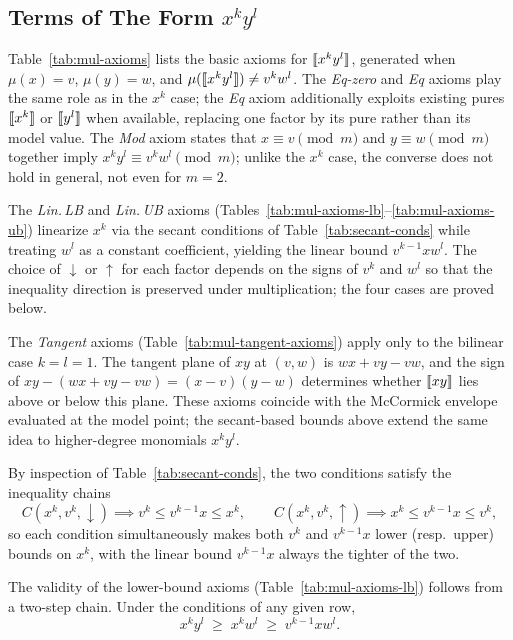 \subsection{Terms of The Form $x^k y^l$}







Table~\ref{tab:mul-axioms} lists the basic axioms for $\llbracket x^k y^l \rrbracket$, generated when
$\mu(x)=v$, $\mu(y)=w$, and $\mu(\llbracket x^k y^l \rrbracket) \neq v^k w^l$.
The \textit{Eq-zero} and \textit{Eq} axioms play the same role as in the $x^k$ case;
the \textit{Eq} axiom additionally exploits existing pures $\llbracket x^k \rrbracket$ or $\llbracket y^l \rrbracket$ when
available, replacing one factor by its pure rather than its model value.
The \textit{Mod} axiom states that $x \equiv v \pmod{m}$ and $y \equiv w \pmod{m}$ together
imply $x^k y^l \equiv v^k w^l \pmod{m}$; unlike the $x^k$ case, the converse does not hold in
general, not even for $m = 2$.

The \textit{Lin.\,LB} and \textit{Lin.\,UB} axioms
(Tables~\ref{tab:mul-axioms-lb}--\ref{tab:mul-axioms-ub}) linearize $x^k$ via the secant
conditions of Table~\ref{tab:secant-conds} while treating $w^l$ as a constant coefficient,
yielding the linear bound $v^{k-1}x w^l$.
The choice of $\downarrow$ or $\uparrow$ for each factor depends on the signs of $v^k$ and
$w^l$ so that the inequality direction is preserved under multiplication; the four cases are
proved below.

The \textit{Tangent} axioms (Table~\ref{tab:mul-tangent-axioms}) apply only to the bilinear
case $k = l = 1$.
The tangent plane of $xy$ at $(v, w)$ is $wx + vy - vw$, and the sign of
$xy - (wx + vy - vw) = (x-v)(y-w)$ determines whether $\llbracket xy \rrbracket$ lies above or below this
plane.
These axioms coincide with the McCormick envelope~\cite{mccormick1976} evaluated at the
model point; the secant-based bounds above extend the same idea to higher-degree monomials
$x^k y^l$.

By inspection of Table~\ref{tab:secant-conds}, the two conditions satisfy the inequality chains
\[
	\mathit{C}(x^k,v^k,\downarrow) \implies v^k \leq v^{k-1}x \leq x^k,
	\qquad
	\mathit{C}(x^k,v^k,\uparrow) \implies x^k \leq v^{k-1}x \leq v^k,
\]
so each condition simultaneously makes both $v^k$ and $v^{k-1}x$ lower (resp.\ upper) bounds on $x^k$,
with the linear bound $v^{k-1}x$ always the tighter of the two.

The validity of the lower-bound axioms (Table~\ref{tab:mul-axioms-lb}) follows from a two-step chain.
Under the conditions of any given row,
\[
	x^k y^l \;\geq\; x^k w^l \;\geq\; v^{k-1}x w^l.
\]

